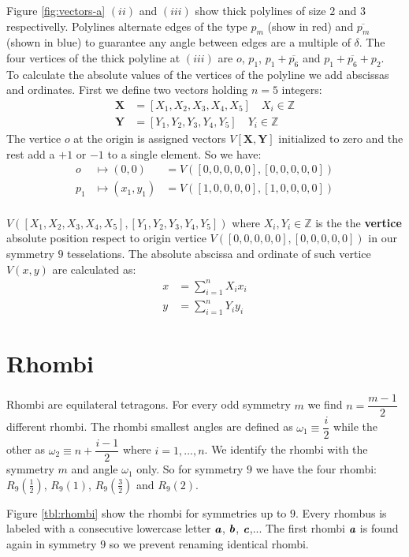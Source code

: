 \documentclass[11pt]{article}
\def\mathbi#1{\textbf{\em #1}}
\begin{document}
Figure \ref{fig:vectors-a} $(ii)$ and $(iii)$ show thick polylines of size $2$ and $3$ respectivelly. Polylines alternate edges of the type $p_m$ (show in red) and $\overline{p_m}$  (shown in blue) to guarantee any angle between edges are a multiple of $\delta$. The four vertices of the thick polyline at $(iii)$ are $o$, $p_1$, $p_1 + \overline{p_6}$ and $p_1 + \overline{p_6} + p_2$.
\\
To calculate the absolute values of the vertices of the polyline we add abscissas and ordinates. First we define two vectors holding $n=5$ integers:
\begin{align}
\textbf{X} &= [X_1, X_2, X_3, X_4, X_5] \quad X_i \in \mathbb{Z} \\
\textbf{Y} &= [Y_1, Y_2, Y_3, Y_4, Y_5] \quad Y_i \in \mathbb{Z}
\end{align}
The vertice $o$ at the origin is assigned vectors $V[\textbf{X},\textbf{Y}]$ initialized to zero and the rest add a $+1$ or $-1$ to a single element. So we have:
\begin{align}
o   &\mapsto (0,0)     &= V([0,0,0,0,0],[0,0,0,0,0]) \\
p_1 &\mapsto (x_1,y_1) &= V([1,0,0,0,0],[1,0,0,0,0])
\end{align}
\\
$V([X_1,X_2,X_3,X_4,X_5],[Y_1,Y_2,Y_3,Y_4,Y_5])$ where $X_i,Y_i \in \mathbb{Z}$ is the the \textbf{vertice} absolute position respect to origin vertice $V([0,0,0,0,0],[0,0,0,0,0])$ in our symmetry $9$ tesselations. The absolute abscissa and ordinate of such vertice $V(x,y)$ are calculated as:
\begin{align}
x &= \sum_{i=1}^{n}X_ix_i\\
y &= \sum_{i=1}^{n}Y_iy_i
\end{align}


\section{Rhombi}

Rhombi are equilateral tetragons. For every odd symmetry $m$ we find $n = \dfrac{m-1}2$ different rhombi. The rhombi smallest angles are defined as $\omega_1 \equiv \dfrac{i}2$ while the other as $\omega_2 \equiv n + \dfrac{i-1}2$ where $i = 1,...,n$. We identify the rhombi with the symmetry $m$ and angle $\omega_1$ only. So for symmetry $9$ we have the four rhombi: $R_9\left(\frac{1}2\right)$, $R_9(1)$, $R_9\left(\frac{3}2\right)$ and $R_9(2)$.

Figure \ref{tbl:rhombi} show the rhombi for symmetries up to $9$. Every rhombus is labeled with a consecutive lowercase letter $\mathbi{a}$, $\mathbi{b}$, $\mathbi{c}$,... The first rhombi $\mathbi{a}$ is found again in symmetry $9$ so we prevent renaming identical rhombi.
\end{document}
